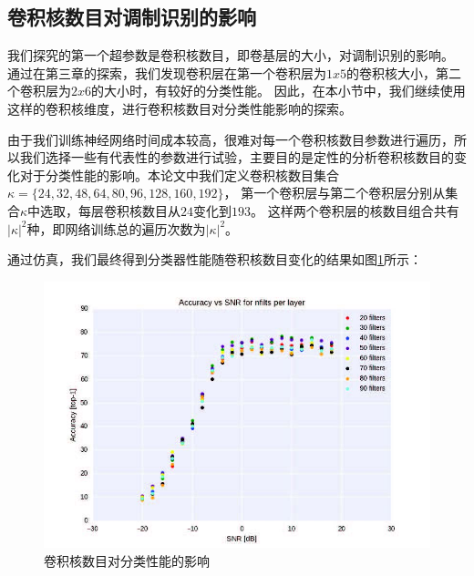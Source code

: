 \subsection{卷积核数目对调制识别的影响}
我们探究的第一个超参数是卷积核数目，即卷基层的大小，对调制识别的影响。
通过在第三章的探索，我们发现卷积层在第一个卷积层为$1x5$的卷积核大小，第二个卷积层为$2x6$的大小时，有较好的分类性能。
因此，在本小节中，我们继续使用这样的卷积核维度，进行卷积核数目对分类性能影响的探索。\par
由于我们训练神经网络时间成本较高，很难对每一个卷积核数目参数进行遍历，所以我们选择一些有代表性的参数进行试验，主要目的是定性的分析卷积核数目的变化对于分类性能的影响。本论文中我们定义卷积核数目集合$\kappa =\{24, 32, 48, 64, 80, 96, 128, 160, 192\}$，
第一个卷积层与第二个卷积层分别从集合$\kappa$中选取，每层卷积核数目从$24$变化到$193$。
这样两个卷积层的核数目组合共有$|\kappa|^2$种，即网络训练总的遍历次数为$|\kappa|^2$。\par
通过仿真，我们最终得到分类器性能随卷积核数目变化的结果如图\ref{sec:fig_5_1}所示：\par
\begin{figure}[!h]
	\centering
	\includegraphics[scale=1.2]{figures/chapter_5/fig_5_1}
	\caption{卷积核数目对分类性能的影响} \label{sec:fig_5_1}
\end{figure}

